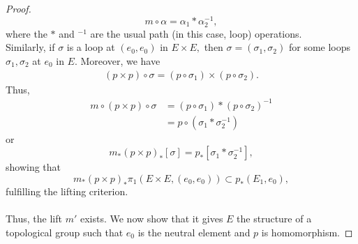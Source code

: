 \documentclass[12pt]{article}
\theoremstyle{definition}
\numberwithin{thm}{section}
\begin{document}
\begin{proof}
\begin{equation*}
		m\circ\alpha = \alpha_1*\alpha_2^{-1},
	\end{equation*}
	where the $*$ and $^{-1}$ are the usual path (in this case, loop) operations.\\
	Similarly, if $\sigma$ is a loop at $(e_0, e_0)$ in $E \times E,$ then $\sigma = (\sigma_1, \sigma_2)$ for some loops $\sigma_1, \sigma_2$ at $e_0$ in $E.$ Moreover, we have
	\begin{align*} 
		(p\times p)\circ\sigma = (p \circ \sigma_1)\times(p \circ \sigma_2).
	\end{align*}
	Thus,
	\begin{align*} 
		m\circ(p \times p) \circ \sigma &= (p \circ \sigma_1)*(p \circ \sigma_2)^{-1}\\
		&= p \circ (\sigma_1 * \sigma_2^{-1})
	\end{align*}
	or
	\begin{equation*} 
		m_*(p\times p)_*[\sigma] = p_*[\sigma_1 * \sigma_2^{-1}],	
	\end{equation*}
	showing that
	\begin{equation*} 
		m_*(p \times p)_*\pi_1(E\times E, (e_0, e_0)) \subset p_*(E_1, e_0),
	\end{equation*}
	fulfilling the lifting criterion.\\~\\
	Thus, the lift $m'$ exists. We now show that it gives $E$ the structure of a topological group such that $e_0$ is the neutral element and $p$ is homomorphism.
\end{proof}
\end{document}
